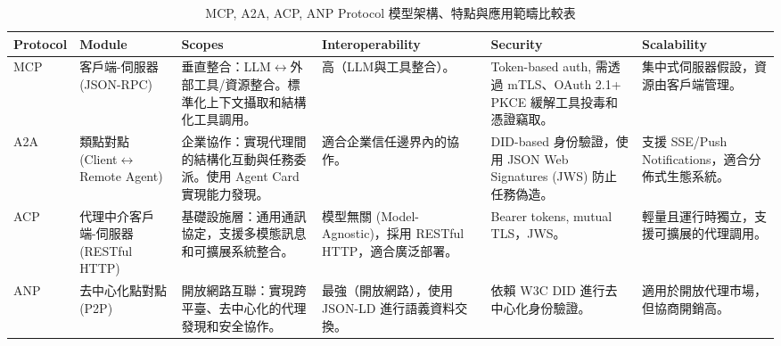 \begin{ZhChapter}
\begin{table}[htbp]
    \centering
    \scriptsize
    \caption{MCP, A2A, ACP, ANP Protocol 模型架構、特點與應用範疇比較表} \label{tab:protocol_comparison}
    \renewcommand{\tabularxcolumn}[1]{>{\raggedright\arraybackslash}m{#1}}
    \begin{tabularx}{\linewidth}{@{} l X X X X X @{}}
        \toprule
        \textbf{Protocol} & \textbf{Module} & \textbf{Scopes} & \textbf{Interoperability} & \textbf{Security} & \textbf{Scalability} \\
        \midrule
        
        MCP & 
        客戶端-伺服器 (JSON-RPC) & 
        垂直整合：LLM$\leftrightarrow$外部工具/資源整合。標準化上下文攝取和結構化工具調用。 & 
        高（LLM與工具整合）。 & 
        Token-based auth, 需透過 mTLS、OAuth 2.1+ PKCE 緩解工具投毒和憑證竊取。 & 
        集中式伺服器假設，資源由客戶端管理。 \\
        \addlinespace
        
        A2A & 
        類點對點 (Client$\leftrightarrow$Remote Agent) & 
        企業協作：實現代理間的結構化互動與任務委派。使用 Agent Card 實現能力發現。 & 
        適合企業信任邊界內的協作。 & 
        DID-based 身份驗證，使用 JSON Web Signatures (JWS) 防止任務偽造。 & 
        支援 SSE/Push Notifications，適合分佈式生態系統。 \\
        \addlinespace
        
        ACP & 
        代理中介客戶端-伺服器 (RESTful HTTP) & 
        基礎設施層：通用通訊協定，支援多模態訊息和可擴展系統整合。 & 
        模型無關 (Model-Agnostic)，採用 RESTful HTTP，適合廣泛部署。 & 
        Bearer tokens, mutual TLS，JWS。 & 
        輕量且運行時獨立，支援可擴展的代理調用。 \\
        \addlinespace
        
        ANP & 
        去中心化點對點 (P2P) & 
        開放網路互聯：實現跨平臺、去中心化的代理發現和安全協作。 & 
        最強（開放網路），使用 JSON-LD 進行語義資料交換。 & 
        依賴 W3C DID 進行去中心化身份驗證。 & 
        適用於開放代理市場，但協商開銷高。 \\
        \bottomrule
    \end{tabularx}
\end{table}


\end{ZhChapter}
